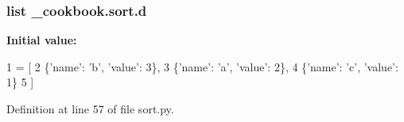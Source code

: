 \hypertarget{namespace__cookbook_1_1sort_a75232840573a2c0ea5f03c47fc06f540}{
\subsubsection[{d}]{\setlength{\rightskip}{0pt plus 5cm}list \-\_\-cookbook.\-sort.\-d}}\label{namespace__cookbook_1_1sort_a75232840573a2c0ea5f03c47fc06f540}
{\bfseries Initial value\-:}
\begin{DoxyCode}
1 = [
2     \{\textcolor{stringliteral}{'name'}: \textcolor{stringliteral}{'b'}, \textcolor{stringliteral}{'value'}: 3\},
3     \{\textcolor{stringliteral}{'name'}: \textcolor{stringliteral}{'a'}, \textcolor{stringliteral}{'value'}: 2\},
4     \{\textcolor{stringliteral}{'name'}: \textcolor{stringliteral}{'c'}, \textcolor{stringliteral}{'value'}: 1\}
5 ]
\end{DoxyCode}


Definition at line 57 of file sort.\-py.

